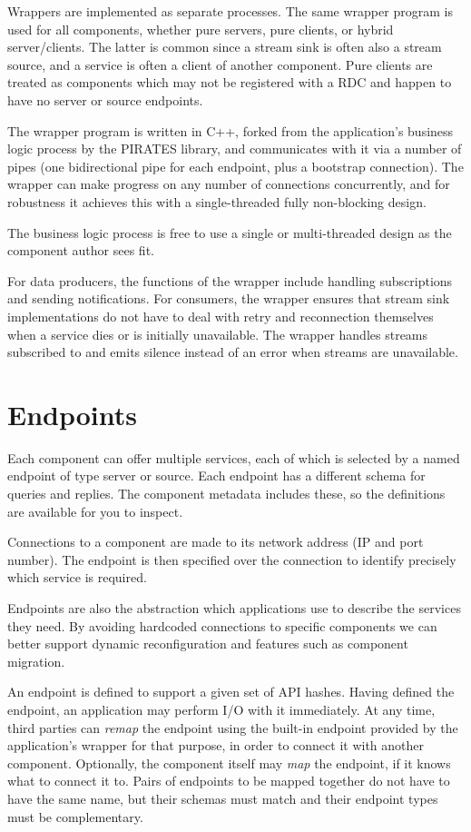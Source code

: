 \documentclass[12pt,a4paper,twoside]{article}
\renewcommand{\_}{\texttt{\symbol{95}}}
\begin{document}
Wrappers are implemented as separate processes.
The same wrapper program is used for all components, whether pure
servers, pure clients, or
hybrid server/clients. The latter is common since a stream
sink is often also a stream source, and a service is often a
client of another component.
Pure clients are treated as components which may not be registered with
a RDC and happen to have no server or source endpoints.

The wrapper program is written in C++, forked from the application's
business logic process by the PIRATES library, and communicates with it
via a number of pipes (one bidirectional pipe for each endpoint, plus
a bootstrap connection). The wrapper can make progress on any number of
connections concurrently, and for robustness it achieves this with a
single-threaded fully non-blocking design.

The business logic process is free to use a single or multi-threaded
design as the component author sees fit.

For data producers, the functions of the wrapper include handling
subscriptions and sending notifications.
For consumers, the wrapper ensures that
stream sink implementations do not have to deal with retry and
reconnection themselves when a service dies or is initially unavailable.
The wrapper handles streams subscribed to and emits silence instead of
an error when streams are unavailable.

\section{Endpoints}

Each component can offer multiple services, each of which is
selected by a named endpoint of type server or source.
Each endpoint has a different
schema for queries and replies. The component metadata
includes these, so the definitions are available for you to inspect.

Connections to a component are made to its network address
(IP and port number). The endpoint is then specified over the
connection to identify precisely which service is required.

Endpoints are also the abstraction which applications use to describe
the services they need. By avoiding hardcoded connections to
specific components we can better support
dynamic reconfiguration and features such as component migration.

An endpoint is defined to support a given set of API hashes.
Having defined the endpoint, an application may perform I/O with it
immediately. At any time, third parties can
\textit{remap} the endpoint using the built-in endpoint provided by
the application's wrapper for that purpose, in order to connect
it with another component. Optionally, the component itself
may \textit{map} the endpoint, if it knows what to connect it to.
Pairs of endpoints to be mapped together do not have to have the same name,
but their schemas must match and their endpoint types must be complementary.
\end{document}
